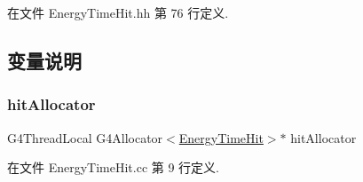 在文件 Energy\+Time\+Hit.\+hh 第 76 行定义.



\subsection{变量说明}
\mbox{\label{EnergyTimeHit_8hh_ad468c55ae1e9db9da0cf986eb120230f}} 
\subsubsection{\texorpdfstring{hit\+Allocator}{hitAllocator}}
{\footnotesize\ttfamily G4\+Thread\+Local G4\+Allocator$<$\hyperlink{classEnergyTimeHit}{Energy\+Time\+Hit}$>$$\ast$ hit\+Allocator}



在文件 Energy\+Time\+Hit.\+cc 第 9 行定义.


